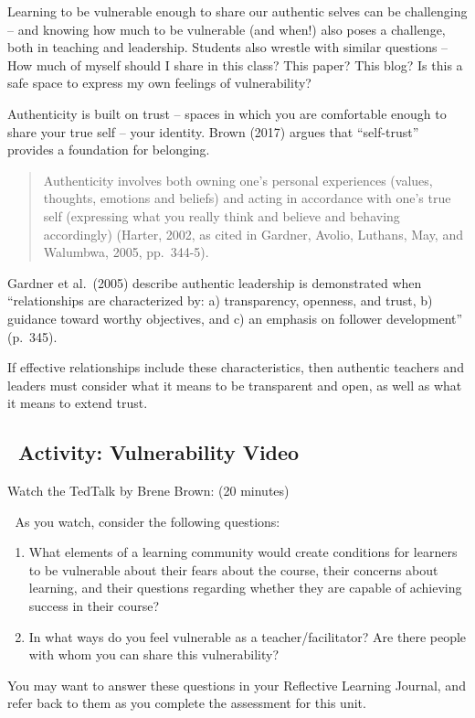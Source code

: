 \documentclass[
]{book}
\begin{document}
Learning to be vulnerable enough to share our authentic selves can be challenging -- and knowing how much to be vulnerable (and when!) also poses a challenge, both in teaching and leadership. Students also wrestle with similar questions -- How much of myself should I share in this class? This paper? This blog? Is this a safe space to express my own feelings of vulnerability?

Authenticity is built on trust
-- spaces in which you are comfortable enough to share your true self
-- your identity. Brown (2017) argues that ``self-trust'' provides a foundation for belonging.

\begin{quote}
Authenticity involves both owning one's personal experiences (values, thoughts, emotions and beliefs) and acting in accordance with one's true self (expressing what you really think and believe and behaving accordingly) (Harter, 2002, as cited in Gardner, Avolio, Luthans, May, and Walumbwa, 2005, pp.~344-5).
\end{quote}

Gardner et al.~(2005) describe authentic leadership is demonstrated when ``relationships are characterized by: a) transparency, openness, and trust, b) guidance toward worthy objectives, and c) an emphasis on follower development'' (p.~345).

If effective relationships include these characteristics, then authentic teachers and leaders must consider what it means to be transparent and open, as well as what it means to extend trust.

\hypertarget{activity-vulnerability-video}{%
\subsection{~Activity: Vulnerability Video}\label{activity-vulnerability-video}}

\begin{video}
Watch the TedTalk by Brene Brown: (20 minutes)

💭 As you watch, consider the following questions:

\begin{enumerate}
\def\arabic{enumi}.{enumi{enumi}.}
\item
  What elements of a learning community would create conditions for
  learners to be vulnerable about their fears about the course, their
  concerns about learning, and their questions regarding whether they
  are capable of achieving success in their course?
\item
  In what ways do you feel vulnerable as a teacher/facilitator? Are
  there people with whom you can share this vulnerability?
\end{enumerate}

You may want to answer these questions in your Reflective Learning
Journal, and refer back to them as you complete the assessment for this
unit.
\end{video}
\end{document}
